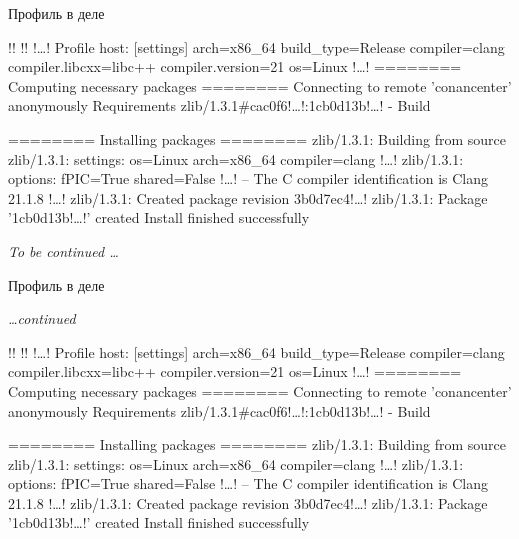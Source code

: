 \documentclass[compress, 8pt, aspectratio=169]{beamer}
\begin{document}
\begin{frame}[fragile]{Профиль в деле}

  {\small
  \begin{terminalwindow}[!!][minted options={escapeinside=!!, lastline=15}]
!!
!!
!\dots!
Profile host:
[settings]
arch=x86_64
build_type=Release
compiler=clang
compiler.libcxx=libc++
compiler.version=21
os=Linux
!\dots!
======== Computing necessary packages ========
Connecting to remote 'conancenter' anonymously
Requirements
    zlib/1.3.1#cac0f6!\dots!:1cb0d13b!\dots! - Build

======== Installing packages ========
zlib/1.3.1: Building from source
zlib/1.3.1: settings: os=Linux arch=x86_64 compiler=clang !\dots!
zlib/1.3.1: options: fPIC=True shared=False
!\dots!
-- The C compiler identification is Clang 21.1.8
!\dots!
zlib/1.3.1: Created package revision 3b0d7ec4!\dots!
zlib/1.3.1: Package '1cb0d13b!\dots!' created
Install finished successfully
  \end{terminalwindow}
  }

  \textit{To be continued \dots}

\end{frame}

\begin{frame}[fragile]{Профиль в деле}

  \textit{\dots continued}\bigbreak

  {\small
  \begin{terminalwindow}[!!][minted options={escapeinside=!!, firstline=16}]
!!
!!
!\dots!
Profile host:
[settings]
arch=x86_64
build_type=Release
compiler=clang
compiler.libcxx=libc++
compiler.version=21
os=Linux
!\dots!
======== Computing necessary packages ========
Connecting to remote 'conancenter' anonymously
Requirements
    zlib/1.3.1#cac0f6!\dots!:1cb0d13b!\dots! - Build

======== Installing packages ========
zlib/1.3.1: Building from source
zlib/1.3.1: settings: os=Linux arch=x86_64 compiler=clang !\dots!
zlib/1.3.1: options: fPIC=True shared=False
!\dots!
-- The C compiler identification is Clang 21.1.8
!\dots!
zlib/1.3.1: Created package revision 3b0d7ec4!\dots!
zlib/1.3.1: Package '1cb0d13b!\dots!' created
Install finished successfully
  \end{terminalwindow}
  }

\end{frame}
\end{document}
